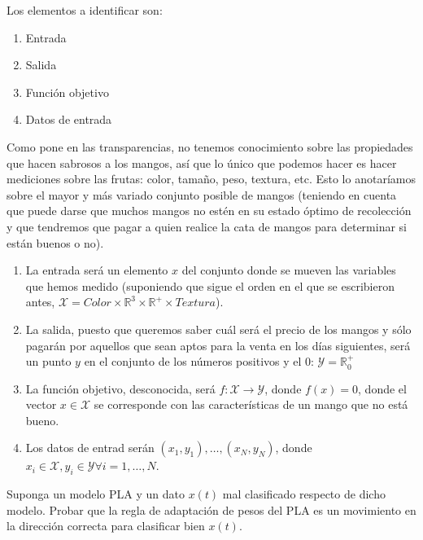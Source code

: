 \documentclass[11pt,leqno]{article}
\theoremstyle{definition}
\begin{document}
\begin{solucion}
Los elementos a identificar son:
\begin{enumerate}[a]
\item Entrada
\item Salida
\item Función objetivo
\item Datos de entrada
\end{enumerate}

Como pone en las transparencias, no tenemos conocimiento sobre las propiedades que hacen sabrosos a los mangos, así que lo único que podemos hacer es hacer mediciones sobre las frutas: color, tamaño, peso, textura, etc. Esto lo anotaríamos sobre el mayor y más variado conjunto posible de mangos (teniendo en cuenta que puede darse que muchos mangos no estén en su estado óptimo de recolección y que tendremos que pagar a quien realice la cata de mangos para determinar si están buenos o no).
\begin{enumerate}[a]
\item La entrada será un elemento $x$ del conjunto donde se mueven las variables que hemos medido (suponiendo que sigue el orden en el que se escribieron antes, $ \mathcal{X} = \textit{Color} \times \mathbb{R}^3 \times \mathbb{R}^+ \times \textit{Textura}$).
\item La salida, puesto que queremos saber cuál será el precio de los mangos y sólo pagarán por aquellos que sean aptos para la venta en los días siguientes, será un punto $y$ en el conjunto de los números positivos y el $0$: $\mathcal{Y} = \mathbb{R}^+_0$
\item La función objetivo, desconocida, será $f:\mathcal{X} \longrightarrow \mathcal{Y}$, donde $f(x) = 0$, donde el vector $x \in \mathcal{X}$ se corresponde con las características de un mango que no está bueno.
\item Los datos de entrad serán $(x_1, y_1), \dots, (x_N, y_N)$, donde $x_i \in \mathcal{X}, y_i \in \mathcal{Y} \forall i=1, \dots, N$.

\end{enumerate}
\end{solucion}

\begin{cuestion}
Suponga un modelo PLA y un dato $x(t)$ mal clasificado respecto de dicho modelo. Probar que la regla de adaptación de pesos del PLA es un movimiento en la dirección correcta para clasificar bien $x(t)$.
\end{cuestion}
\end{document}
